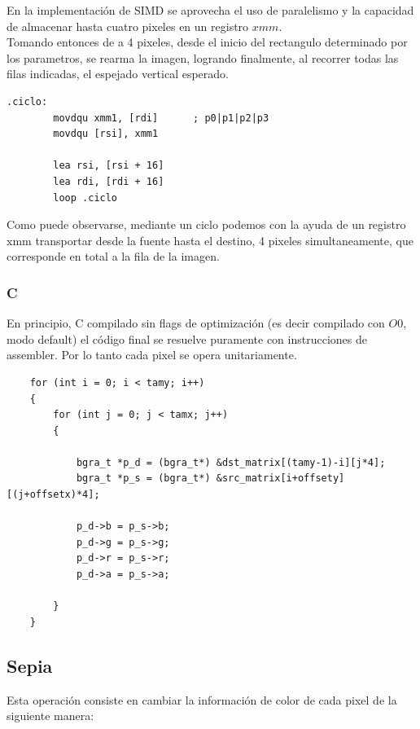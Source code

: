 En la implementación de SIMD se aprovecha el uso de paralelismo y la capacidad de almacenar hasta cuatro pixeles en un registro $xmm$.\\ 
Tomando entonces de a 4 pixeles, desde el inicio del rectangulo determinado por los parametros, se rearma la imagen, logrando finalmente, al recorrer todas las filas indicadas, el espejado vertical esperado.

\begin{codesnippet}
\begin{verbatim}
.ciclo:
        movdqu xmm1, [rdi]      ; p0|p1|p2|p3
        movdqu [rsi], xmm1
    
        lea rsi, [rsi + 16]
        lea rdi, [rdi + 16]
        loop .ciclo
\end{verbatim}
\end{codesnippet}

Como puede observarse, mediante un ciclo podemos con la ayuda de un registro xmm transportar desde la fuente hasta el destino, 4 pixeles simultaneamente, que corresponde en total a la fila de la imagen.

\subsubsection{C}

En principio, C compilado sin flags de optimización (es decir compilado con $O0$, modo default) el código final se resuelve puramente con instrucciones de assembler. Por lo tanto cada pixel se opera unitariamente. 

\begin{codesnippet}
\begin{verbatim}
    for (int i = 0; i < tamy; i++) 
    {
        for (int j = 0; j < tamx; j++) 
        {

            bgra_t *p_d = (bgra_t*) &dst_matrix[(tamy-1)-i][j*4];
            bgra_t *p_s = (bgra_t*) &src_matrix[i+offsety][(j+offsetx)*4];

            p_d->b = p_s->b;
            p_d->g = p_s->g;
            p_d->r = p_s->r;
            p_d->a = p_s->a;

        }
    }
\end{verbatim}
\end{codesnippet}

\subsection{Sepia}
Esta operación consiste en cambiar la información de color de cada pixel de la siguiente manera:


